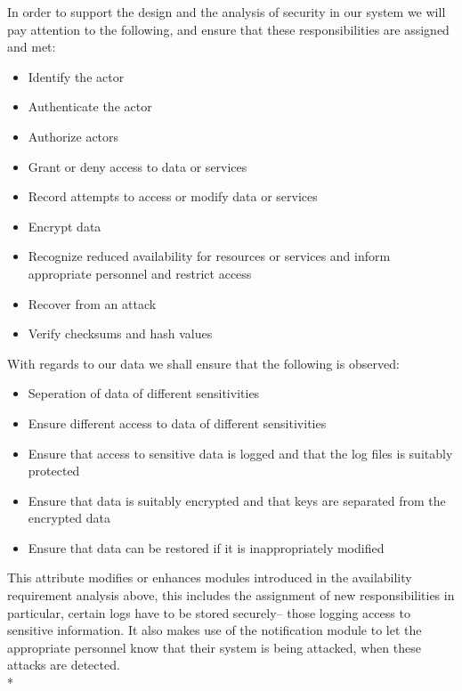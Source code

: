\documentclass[11pt]{article}
\begin{document}
In order to support the design and the analysis of security in our system we will pay attention to the following, and ensure that these responsibilities are assigned and met:
\begin{itemize}
	\item[] Identify the actor
	\item[] Authenticate the actor
	\item[] Authorize actors
	\item[] Grant or deny access to data or services
	\item[] Record attempts to access or modify data or services
	\item[] Encrypt data
	\item[] Recognize reduced availability for resources or services and inform appropriate personnel and restrict access
	\item[] Recover from an attack
	\item[] Verify checksums and hash values
\end{itemize}
 With regards to our data we shall ensure that the following is observed:
\begin{itemize}
	\item[] Seperation of data of different sensitivities
	\item[] Ensure different access to data of different sensitivities
	\item[] Ensure that access to sensitive data is logged and that the log files is suitably protected
	\item[] Ensure that data is suitably encrypted and that keys are separated from the encrypted data
	\item[] Ensure that data can be restored if it is inappropriately modified
\end{itemize}

This attribute modifies or enhances modules introduced in the availability requirement analysis above, this includes the assignment of new responsibilities in particular, certain logs have to be stored securely-- those logging access to sensitive information. It also makes use of the notification module to let the appropriate personnel know that their system is being attacked, when these attacks are detected.\\*
\end{document}
